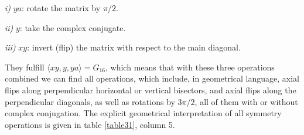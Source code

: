 {{\it i)} $ya$: rotate the matrix by $\pi/2$.

{\it ii)} $y$: take the complex conjugate.

{\it iii)} $xy$: invert (flip) the matrix with respect to the main diagonal.


They fulfill $\langle xy, y, ya\rangle=G_{16}$, which means that with these three operations combined we can
find all operations, which include, in geometrical language, axial flips along perpendicular horizontal or vertical bisectors,
and axial flips along the perpendicular diagonals, as well as rotations by $3\pi/2$, all of them with or without complex conjugation.
The explicit geometrical interpretation of all symmetry operations is given in table \ref{table31}, column 5.

}
